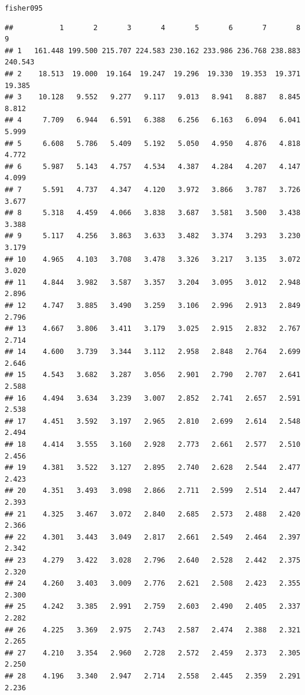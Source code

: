\documentclass[onecolumn,12pt]{book}\usepackage[]{graphicx}\usepackage[]{color}
\makeatletter
\newcommand{\hlstd}[1]{\textcolor[rgb]{0.345,0.345,0.345}{#1}}%
\newenvironment{kframe}{%
 \def\at@end@of@kframe{}%
 \ifinner\ifhmode%
  \def\at@end@of@kframe{\end{minipage}}%
  \begin{minipage}{\columnwidth}%
 \fi\fi%
 \def\FrameCommand##1{\hskip\@totalleftmargin \hskip-\fboxsep
 \colorbox{shadecolor}{##1}\hskip-\fboxsep
     \hskip-\linewidth \hskip-\@totalleftmargin \hskip\columnwidth}%
 \MakeFramed {\advance\hsize-\width
   \@totalleftmargin\z@ \linewidth\hsize
   \@setminipage}}%
 {\par\unskip\endMakeFramed%
 \at@end@of@kframe}
\newenvironment{knitrout}{}{} %
\makeatother
\begin{document}
\begin{knitrout}
\color{fgcolor}\begin{kframe}
\begin{alltt}
\hlstd{fisher095}
\end{alltt}
\begin{verbatim}
##           1       2       3       4       5       6       7       8       9
## 1   161.448 199.500 215.707 224.583 230.162 233.986 236.768 238.883 240.543
## 2    18.513  19.000  19.164  19.247  19.296  19.330  19.353  19.371  19.385
## 3    10.128   9.552   9.277   9.117   9.013   8.941   8.887   8.845   8.812
## 4     7.709   6.944   6.591   6.388   6.256   6.163   6.094   6.041   5.999
## 5     6.608   5.786   5.409   5.192   5.050   4.950   4.876   4.818   4.772
## 6     5.987   5.143   4.757   4.534   4.387   4.284   4.207   4.147   4.099
## 7     5.591   4.737   4.347   4.120   3.972   3.866   3.787   3.726   3.677
## 8     5.318   4.459   4.066   3.838   3.687   3.581   3.500   3.438   3.388
## 9     5.117   4.256   3.863   3.633   3.482   3.374   3.293   3.230   3.179
## 10    4.965   4.103   3.708   3.478   3.326   3.217   3.135   3.072   3.020
## 11    4.844   3.982   3.587   3.357   3.204   3.095   3.012   2.948   2.896
## 12    4.747   3.885   3.490   3.259   3.106   2.996   2.913   2.849   2.796
## 13    4.667   3.806   3.411   3.179   3.025   2.915   2.832   2.767   2.714
## 14    4.600   3.739   3.344   3.112   2.958   2.848   2.764   2.699   2.646
## 15    4.543   3.682   3.287   3.056   2.901   2.790   2.707   2.641   2.588
## 16    4.494   3.634   3.239   3.007   2.852   2.741   2.657   2.591   2.538
## 17    4.451   3.592   3.197   2.965   2.810   2.699   2.614   2.548   2.494
## 18    4.414   3.555   3.160   2.928   2.773   2.661   2.577   2.510   2.456
## 19    4.381   3.522   3.127   2.895   2.740   2.628   2.544   2.477   2.423
## 20    4.351   3.493   3.098   2.866   2.711   2.599   2.514   2.447   2.393
## 21    4.325   3.467   3.072   2.840   2.685   2.573   2.488   2.420   2.366
## 22    4.301   3.443   3.049   2.817   2.661   2.549   2.464   2.397   2.342
## 23    4.279   3.422   3.028   2.796   2.640   2.528   2.442   2.375   2.320
## 24    4.260   3.403   3.009   2.776   2.621   2.508   2.423   2.355   2.300
## 25    4.242   3.385   2.991   2.759   2.603   2.490   2.405   2.337   2.282
## 26    4.225   3.369   2.975   2.743   2.587   2.474   2.388   2.321   2.265
## 27    4.210   3.354   2.960   2.728   2.572   2.459   2.373   2.305   2.250
## 28    4.196   3.340   2.947   2.714   2.558   2.445   2.359   2.291   2.236

\end{verbatim}
\end{kframe}
\end{knitrout}
\end{document}
